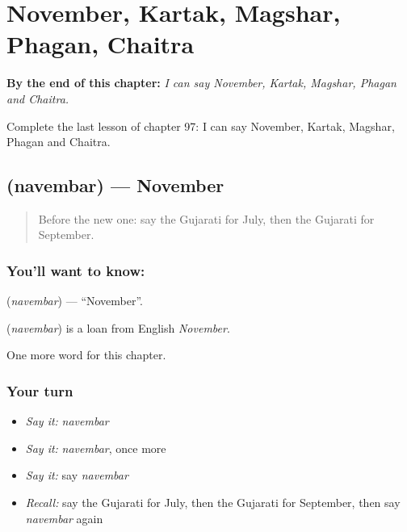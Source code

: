 
\chapter{November, Kartak, Magshar, Phagan, Chaitra}
\label{ch:gu-november-kartak-magshar-phagan-chaitra}

\begin{chapteropening}
\textbf{By the end of this chapter:} \emph{I can say November, Kartak, Magshar, Phagan and Chaitra.}

Complete the last lesson of chapter 97: I can say November, Kartak, Magshar, Phagan and Chaitra.
\end{chapteropening}

\section[\texorpdfstring{\gu{નવેમ્બર} (navembar)}{નવેમ્બર (navembar)}]{ (navembar) — November}

\label{lesson:GU-C97-navembar}



\begin{quote}
Before the new one: say the Gujarati for July, then the Gujarati for September.
\end{quote}

\subsection*{You'll want to know: }
\textbf{} (\emph{navembar}) — \textquotedblleft{}November\textquotedblright{}.

\begin{cousinweb}
\textbf{} (\emph{navembar}) is a loan from English \emph{November}.
\end{cousinweb}

\begin{grammarlens}[title={What you've built}]
One more word for this chapter.
\end{grammarlens}

\subsection*{Your turn}
\begin{itemize}
\raggedright
  \item \emph{Say it:} \emph{navembar}
  \item \emph{Say it:} \emph{navembar}, once more
  \item \emph{Say it:} say \emph{navembar}
  \item \emph{Recall:} say the Gujarati for July, then the Gujarati for September, then say \emph{navembar} again
\end{itemize}


